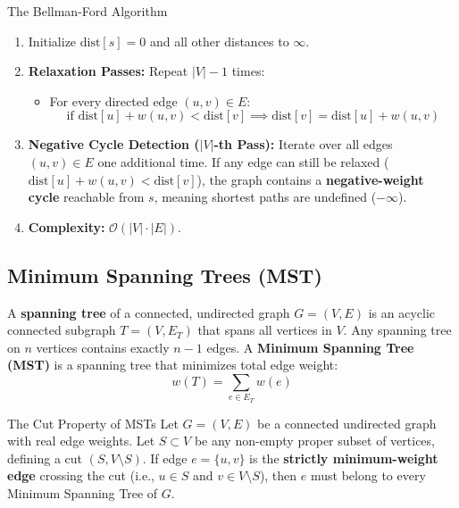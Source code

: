 \begin{theorembox}{The Bellman-Ford Algorithm}
\begin{enumerate}
    \item Initialize $\text{dist}[s] = 0$ and all other distances to $\infty$.
    \item \textbf{Relaxation Passes:} Repeat $|V| - 1$ times:
    \begin{itemize}
        \item For every directed edge $(u, v) \in E$:
        \begin{equation}
        \text{if } \text{dist}[u] + w(u, v) < \text{dist}[v] \implies \text{dist}[v] = \text{dist}[u] + w(u, v)
        \end{equation}
    \end{itemize}
    \item \textbf{Negative Cycle Detection ($|V|$-th Pass):} Iterate over all edges $(u, v) \in E$ one additional time. If any edge can still be relaxed ($\text{dist}[u] + w(u, v) < \text{dist}[v]$), the graph contains a \textbf{negative-weight cycle} reachable from $s$, meaning shortest paths are undefined ($-\infty$).
    \item \textbf{Complexity:} $\mathcal{O}(|V| \cdot |E|)$.
\end{enumerate}
\end{theorembox}

\subsection{Minimum Spanning Trees (MST)}

A \textbf{spanning tree} of a connected, undirected graph $G = (V, E)$ is an acyclic connected subgraph $T = (V, E_T)$ that spans all vertices in $V$. Any spanning tree on $n$ vertices contains exactly $n - 1$ edges.
A \textbf{Minimum Spanning Tree (MST)} is a spanning tree that minimizes total edge weight:
\begin{equation}
w(T) = \sum_{e \in E_T} w(e)
\end{equation}

\begin{theorembox}{The Cut Property of MSTs}
Let $G = (V, E)$ be a connected undirected graph with real edge weights. Let $S \subset V$ be any non-empty proper subset of vertices, defining a cut $(S, V \setminus S)$. 
If edge $e = \{u, v\}$ is the \textbf{strictly minimum-weight edge} crossing the cut (i.e., $u \in S$ and $v \in V \setminus S$), then $e$ must belong to every Minimum Spanning Tree of $G$.
\end{theorembox}

